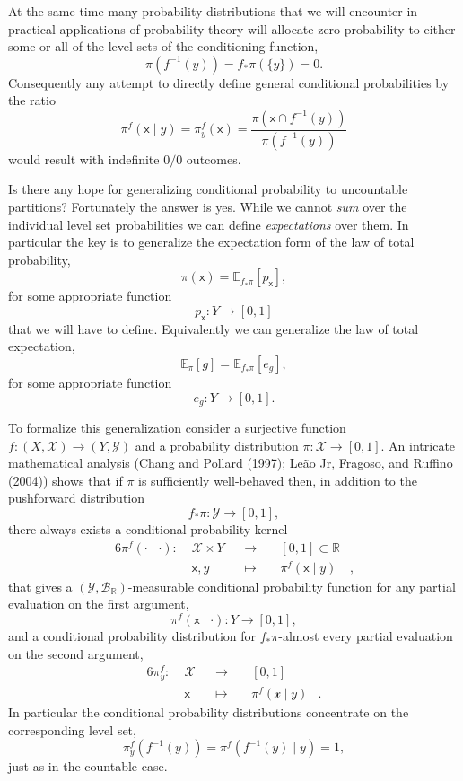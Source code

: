 \documentclass[
  letterpaper,
  DIV=11,
  numbers=noendperiod]{scrartcl}
\begin{document}
At the same time many probability distributions that we will encounter
in practical applications of probability theory will allocate zero
probability to either some or all of the level sets of the conditioning
function, \[
\pi(f^{-1}(y))
= f_{*} \pi( \{ y \} )
= 0.
\] Consequently any attempt to directly define general conditional
probabilities by the ratio \[
\pi^{f}( \mathsf{x} \mid y )
=
\pi^{f}_{y}( \mathsf{x} )
=
\frac{ \pi( \mathsf{x} \cap f^{-1}(y) ) }{ \pi( f^{-1}(y) ) }
\] would result with indefinite \(0 / 0\) outcomes.

Is there any hope for generalizing conditional probability to
uncountable partitions? Fortunately the answer is yes. While we cannot
\emph{sum} over the individual level set probabilities we can define
\emph{expectations} over them. In particular the key is to generalize
the expectation form of the law of total probability, \[
\pi( \mathsf{x} )
=
\mathbb{E}_{f_{*}\pi} [ p_{\mathsf{x}} ],
\] for some appropriate function \[
p_{\mathsf{x}} : Y \rightarrow [0, 1]
\] that we will have to define. Equivalently we can generalize the law
of total expectation, \[
\mathbb{E}_{\pi}[ g ]
=
\mathbb{E}_{ f_{*} \pi } [ e_{g} ],
\] for some appropriate function \[
e_{g} : Y \rightarrow [0, 1].
\]

To formalize this generalization consider a surjective function
\(f : (X, \mathcal{X}) \rightarrow (Y, \mathcal{Y})\) and a probability
distribution \(\pi : \mathcal{X} \rightarrow [0, 1]\). An intricate
mathematical analysis (Chang and Pollard (1997); Leão Jr, Fragoso, and
Ruffino (2004)) shows that if \(\pi\) is sufficiently well-behaved then,
in addition to the pushforward distribution \[
f_{*} \pi : \mathcal{Y} \rightarrow [0, 1],
\] there always exists a conditional probability kernel
\begin{alignat*}{6}
\pi^{f} ( \cdot \mid \cdot )
:\; &\mathcal{X} \times Y& &\rightarrow& \; &[0, 1] \subset \mathbb{R}&
\\
&\mathsf{x}, y& &\mapsto& &\pi^{f} ( \mathsf{x} \mid y )&,
\end{alignat*} that gives a
\((\mathcal{Y}, \mathcal{B}_{\mathbb{R}})\)-measurable conditional
probability function for any partial evaluation on the first argument,
\[
\pi^{f} ( \mathsf{x} \mid \cdot ) : Y \rightarrow [0, 1],
\] and a conditional probability distribution for \(f_{*} \pi\)-almost
every partial evaluation on the second argument, \begin{alignat*}{6}
\pi^{f}_{y}
:\; &\mathcal{X}& &\rightarrow& \; &[0, 1]&
\\
&\mathsf{x}& &\mapsto& &\pi^{f} ( \mathcal{x} \mid y ) &.
\end{alignat*} In particular the conditional probability distributions
concentrate on the corresponding level set, \[
\pi^{f}_{y}( f^{-1}(y) ) = \pi^{f}( f^{-1}(y) \mid y ) = 1,
\] just as in the countable case.
\end{document}
